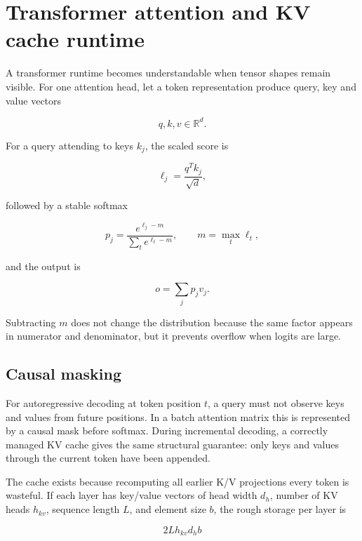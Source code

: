 \hypertarget{appendix-ea2dadd21ce5}{}\label{referencestart:appendix-ea2dadd21ce5}
\section{Transformer attention and KV cache runtime}\label{appendix-ea2dadd21ce5-transformer-attention-and-kv-cache-runtime}

\hypertarget{appendix-ea2dadd21ce5-transformer-attention-and-kv-cache-runtime}{}

A transformer runtime becomes understandable when tensor shapes remain visible. For one attention head, let a token representation produce query, key and value vectors

\[
q,k,v \in \mathbb{R}^{d}.
\]

For a query attending to keys \(k_j\), the scaled score is

\[
\ell_j = \frac{q^T k_j}{\sqrt{d}},
\]

followed by a stable softmax

\[
p_j = \frac{e^{\ell_j-m}}{\sum_t e^{\ell_t-m}},
\qquad m=\max_t \ell_t,
\]

and the output is

\[
o = \sum_j p_j v_j.
\]

Subtracting \(m\) does not change the distribution because the same factor appears in numerator and denominator, but it prevents overflow when logits are large.

\subsection{Causal masking}\label{appendix-ea2dadd21ce5-causal-masking}

\hypertarget{appendix-ea2dadd21ce5-causal-masking}{}

For autoregressive decoding at token position \(t\), a query must not observe keys and values from future positions. In a batch attention matrix this is represented by a causal mask before softmax. During incremental decoding, a correctly managed KV cache gives the same structural guarantee: only keys and values through the current token have been appended.

The cache exists because recomputing all earlier K/V projections every token is wasteful. If each layer has key/value vectors of head width \(d_h\), number of KV heads \(h_{kv}\), sequence length \(L\), and element size \(b\), the rough storage per layer is

\[
2 L h_{kv} d_h b
\]

